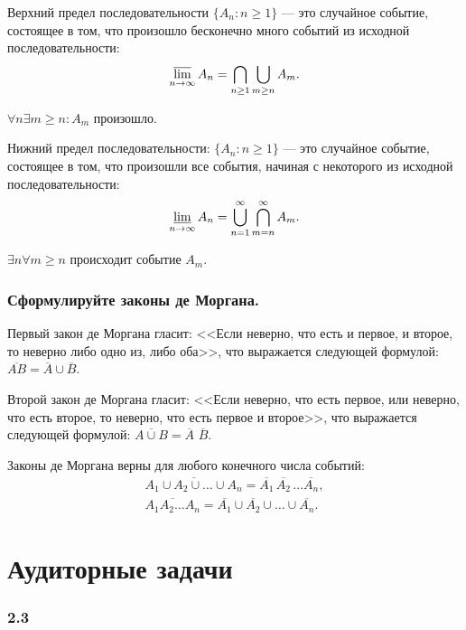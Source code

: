 \documentclass{book}
\begin{document}
Верхний предел последовательности $ \{ A_n : n \geq 1 \} $ --- это случайное событие,
состоящее в том, что произошло бесконечно много событий из исходной последовательности:
$$ \varlimsup \limits_{ n \to \infty } A_n =
\bigcap \limits_{n \geq 1} \bigcup \limits_{ m \geq n } A_m.$$

$ \forall n \exists m \geq n : A_m $ произошло.

Нижний предел последовательности:
$ \{ A_n : n \geq 1 \} $ --- это случайное событие, состоящее в том, что произошли все события, начиная с некоторого из исходной последовательности:
$$ \varliminf \limits_{ n \to \infty } A_n =
\bigcup \limits_{ n = 1 }^\infty \bigcap \limits_{ m = n }^\infty A_m.$$

$ \exists n \forall m \geq n $ происходит событие $A_m$.

\subsubsection*{Сформулируйте законы де Моргана.}

Первый закон де Моргана гласит: <<Если неверно, что есть и первое, и второе, то неверно либо одно из, либо оба>>, что выражается следующей формулой:
$ \overline{ AB } = \overline{ A } \cup \overline{ B }$.

Второй закон де Моргана гласит: <<Если неверно, что есть первое, или неверно, что есть второе, то неверно, что есть первое и второе>>, что выражается следующей формулой:
$ \overline{ A \cup B} = \overline{ A }$ $ \overline{ B }$.

Законы де Моргана верны для любого конечного числа событий:
\begin{equation*}
\begin{split}
\overline{ A_1 \cup A_2 \cup \dotsc \cup A_n } =
\overline{ A_1 } \, \overline{ A_2 } \, \dotsc \overline{ A_n }, \\
\overline{ A_1 A_2 \dotsc A_n } =
\overline{ A_1 } \cup \overline{ A_2 } \cup \dotsc \cup \overline{ A_n }.
\end{split}
\end{equation*}

\section*{Аудиторные задачи}

\subsubsection*{2.3}
\end{document}
